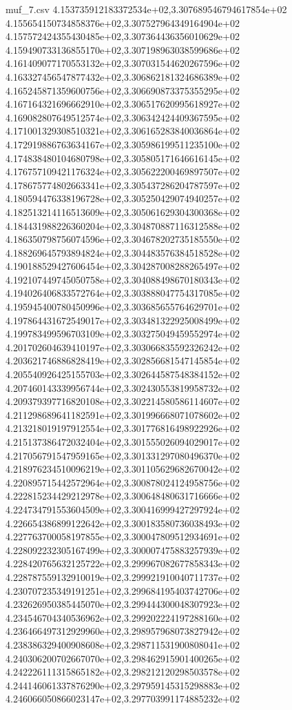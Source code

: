 \begin{filecontents*}{muf_7.csv}
4.153735912183372534e+02,3.307689546794617854e+02
4.155654150734858376e+02,3.307527964349164904e+02
4.157572424355430485e+02,3.307364436356010629e+02
4.159490733136855170e+02,3.307198963038599686e+02
4.161409077170553132e+02,3.307031544620267596e+02
4.163327456547877432e+02,3.306862181324686389e+02
4.165245871359600756e+02,3.306690873375355295e+02
4.167164321696662910e+02,3.306517620995618927e+02
4.169082807649512574e+02,3.306342424409367595e+02
4.171001329308510321e+02,3.306165283840036864e+02
4.172919886763634167e+02,3.305986199511235100e+02
4.174838480104680798e+02,3.305805171646616145e+02
4.176757109421176324e+02,3.305622200469897507e+02
4.178675774802663341e+02,3.305437286204787597e+02
4.180594476338196728e+02,3.305250429074940257e+02
4.182513214116513609e+02,3.305061629304300368e+02
4.184431988226360204e+02,3.304870887116312588e+02
4.186350798756074596e+02,3.304678202735185550e+02
4.188269645793894824e+02,3.304483576384518528e+02
4.190188529427606454e+02,3.304287008288265497e+02
4.192107449745050758e+02,3.304088498670180343e+02
4.194026406833572764e+02,3.303888047754317085e+02
4.195945400780450996e+02,3.303685655764629701e+02
4.197864431672549017e+02,3.303481322925008499e+02
4.199783499596703109e+02,3.303275049459552974e+02
4.201702604639410197e+02,3.303066835592326242e+02
4.203621746886828419e+02,3.302856681547145854e+02
4.205540926425155703e+02,3.302644587548384152e+02
4.207460143339956744e+02,3.302430553819958732e+02
4.209379397716820108e+02,3.302214580586114607e+02
4.211298689641182591e+02,3.301996668071078602e+02
4.213218019197912554e+02,3.301776816498922926e+02
4.215137386472032404e+02,3.301555026094029017e+02
4.217056791547959165e+02,3.301331297080496370e+02
4.218976234510096219e+02,3.301105629682670042e+02
4.220895715442572964e+02,3.300878024124958756e+02
4.222815234429212978e+02,3.300648480631716666e+02
4.224734791553604509e+02,3.300416999427297924e+02
4.226654386899122642e+02,3.300183580736038493e+02
4.227763700058197855e+02,3.300047809512934691e+02
4.228092232305167499e+02,3.300007475883257939e+02
4.228420765632125722e+02,3.299967082677858343e+02
4.228787559132910019e+02,3.299921910040711737e+02
4.230707235349191251e+02,3.299684195403742706e+02
4.232626950385445070e+02,3.299444300048307923e+02
4.234546704340536962e+02,3.299202224197288160e+02
4.236466497312929960e+02,3.298957968073827942e+02
4.238386329400908608e+02,3.298711531900808041e+02
4.240306200702667070e+02,3.298462915901400265e+02
4.242226111315865182e+02,3.298212120298503578e+02
4.244146061337876290e+02,3.297959145315298883e+02
4.246066050866023147e+02,3.297703991174885232e+02

\end{filecontents*}
